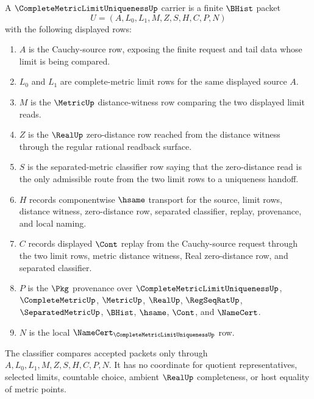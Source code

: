 \begin{definition}
\label{def:complete-metric-limit-uniqueness-carrier}
A $\CompleteMetricLimitUniquenessUp$ carrier is a finite $\BHist$ packet
$$
U=(A,L_{0},L_{1},M,Z,S,H,C,P,N)
$$
with the following displayed rows:
\begin{enumerate}
\item $A$ is the Cauchy-source row, exposing the finite request and tail data whose limit is being compared.
\item $L_{0}$ and $L_{1}$ are complete-metric limit rows for the same displayed source $A$.
\item $M$ is the $\MetricUp$ distance-witness row comparing the two displayed limit reads.
\item $Z$ is the $\RealUp$ zero-distance row reached from the distance witness through the regular rational readback surface.
\item $S$ is the separated-metric classifier row saying that the zero-distance read is the only admissible route from the two limit rows to a uniqueness handoff.
\item $H$ records componentwise $\hsame$ transport for the source, limit rows, distance witness, zero-distance row, separated classifier, replay, provenance, and local naming.
\item $C$ records displayed $\Cont$ replay from the Cauchy-source request through the two limit rows, metric distance witness, Real zero-distance row, and separated classifier.
\item $P$ is the $\Pkg$ provenance over $\CompleteMetricLimitUniquenessUp$, $\CompleteMetricUp$, $\MetricUp$, $\RealUp$, $\RegSeqRatUp$, $\SeparatedMetricUp$, $\BHist$, $\hsame$, $\Cont$, and $\NameCert$.
\item $N$ is the local $\NameCert_{\CompleteMetricLimitUniquenessUp}$ row.
\end{enumerate}
The classifier compares accepted packets only through $A,L_{0},L_{1},M,Z,S,H,C,P,N$. It has no coordinate for quotient representatives, selected limits, countable choice, ambient $\RealUp$ completeness, or host equality of metric points.
\end{definition}

